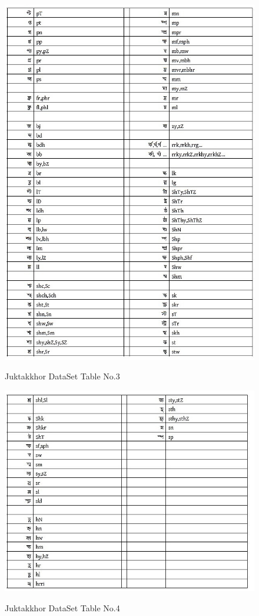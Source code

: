 \documentclass[12pt,oneside,openany,a4paper]{book}
\begin{document}
\begin{figure}
		\caption{Juktakkhor DataSet Table No.3}
		\centering
		\includegraphics[scale=0.7]{data3}
		\label{fig:data3}
\end{figure}
\begin{figure}
		\caption{Juktakkhor DataSet Table No.4}
		\centering
		\includegraphics[scale=0.7]{data4}
		\label{fig:data4}
\end{figure}
\par
\end{document}
